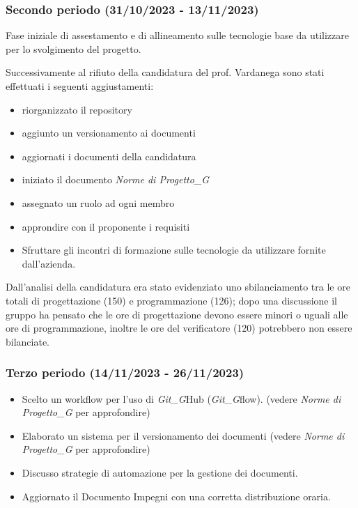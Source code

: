\subsubsection{Secondo periodo (31/10/2023 - 13/11/2023)}
Fase iniziale di assestamento e di allineamento sulle tecnologie base da utilizzare per lo svolgimento del progetto.

Successivamente al rifiuto della candidatura del prof. Vardanega sono stati effettuati i seguenti aggiustamenti:
\begin{itemize}
    \item riorganizzato il repository
    \item aggiunto un versionamento ai documenti
    \item aggiornati i documenti della candidatura
    \item iniziato il documento \textit{Norme di Progetto_G}
    \item assegnato un ruolo ad ogni membro
\end{itemize}

\begin{itemize}
    \item approndire con il proponente i requisiti
    \item Sfruttare gli incontri di formazione sulle tecnologie da utilizzare fornite
dall’azienda.
\end{itemize}

Dall'analisi della candidatura era stato evidenziato uno sbilanciamento tra le ore totali di progettazione (150)
e programmazione (126); dopo una discussione il gruppo ha pensato che le ore di
progettazione devono essere minori o uguali alle ore di programmazione, inoltre le
ore del verificatore (120) potrebbero non essere bilanciate.


\subsubsection{Terzo periodo (14/11/2023 - 26/11/2023)}

\begin{itemize}
    \item Scelto un workflow per l'uso di \textit{Git_G}Hub (\textit{Git_G}flow). (vedere \textit{Norme di Progetto_G} per approfondire)
    \item Elaborato un sistema per il versionamento dei documenti (vedere \textit{Norme di Progetto_G} per approfondire)
    \item Discusso strategie di automazione per la gestione dei documenti.
    \item Aggiornato il Documento Impegni con una corretta distribuzione oraria.
\end{itemize}

